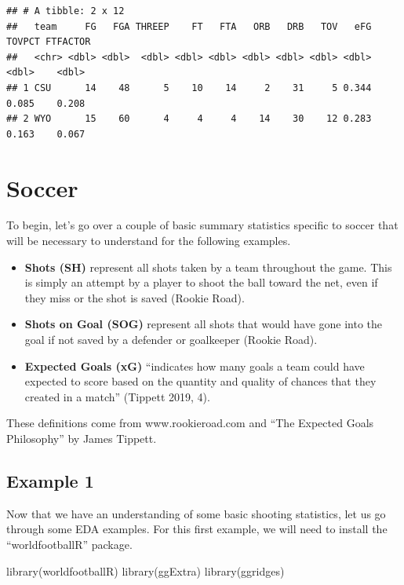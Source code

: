 \documentclass[
  11pt,
]{book}
\newenvironment{Shaded}{\begin{snugshade}}{\end{snugshade}}
\newcommand{\FunctionTok}[1]{\textcolor[rgb]{0.00,0.00,0.00}{#1}}
\newcommand{\NormalTok}[1]{#1}
\theoremstyle{definition}
\theoremstyle{definition}
\theoremstyle{definition}
\theoremstyle{definition}
\theoremstyle{remark}
\begin{document}
\begin{verbatim}
## # A tibble: 2 x 12
##   team     FG   FGA THREEP    FT   FTA   ORB   DRB   TOV   eFG TOVPCT FTFACTOR
##   <chr> <dbl> <dbl>  <dbl> <dbl> <dbl> <dbl> <dbl> <dbl> <dbl>  <dbl>    <dbl>
## 1 CSU      14    48      5    10    14     2    31     5 0.344  0.085    0.208
## 2 WYO      15    60      4     4     4    14    30    12 0.283  0.163    0.067
\end{verbatim}

\hypertarget{soccer}{%
\section{Soccer}\label{soccer}}

To begin, let's go over a couple of basic summary statistics specific to soccer that will be necessary to understand for the following examples.

\begin{itemize}
\item
  \textbf{Shots (SH)} represent all shots taken by a team throughout the game. This is simply an attempt by a player to shoot the ball toward the net, even if they miss or the shot is saved (Rookie Road).
\item
  \textbf{Shots on Goal (SOG)} represent all shots that would have gone into the goal if not saved by a defender or goalkeeper (Rookie Road).
\item
  \textbf{Expected Goals (xG)} ``indicates how many goals a team could have expected to score based on the quantity and quality of chances that they created in a match'' (Tippett 2019, 4).
\end{itemize}

These definitions come from www.rookieroad.com and ``The Expected Goals Philosophy'' by James Tippett.

\hypertarget{example-1}{%
\subsection*{Example 1}\label{example-1}}

Now that we have an understanding of some basic shooting statistics, let us go through some EDA examples. For this first example, we will need to install the ``worldfootballR'' package.

\begin{Shaded}
\begin{Highlighting}[]
\FunctionTok{library}\NormalTok{(worldfootballR)}
\FunctionTok{library}\NormalTok{(ggExtra)}
\FunctionTok{library}\NormalTok{(ggridges)}
\end{Highlighting}
\end{Shaded}
\end{document}
